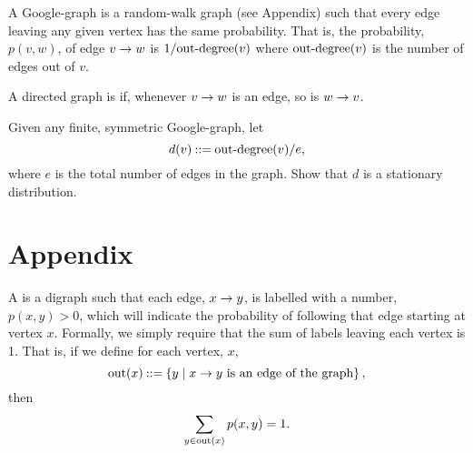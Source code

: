 \documentclass[11pt,twoside]{article}
\begin{document}
\begin{problem}

  A Google-graph is a random-walk graph (see Appendix) such that every
  edge leaving any given vertex has the same probability.  That is, the
  probability, $p(v,w)$, of edge $v \to w$ is $1/\text{out-degree}(v)$ where
  $\text{out-degree}(v)$ is the number of edges out of $v$.

  A directed graph is  if, whenever $v \to w$ is an
  edge, so is $w \to v$.

  Given any finite, symmetric Google-graph, let
\[
d(v) \mathbin{::=} \text{out-degree}(v)/e,
\]
where $e$ is the total number of edges in the graph.  Show that $d$ is a
stationary distribution.


\end{problem}



\section*{Appendix}

A  is a digraph such that each edge,
$x \to y$, is labelled with a number, $p(x,y) > 0$, which will
indicate the probability of following that edge starting at vertex $x$.
Formally, we simply require that the sum of labels leaving each vertex is
1.  That is, if we define for each vertex, $x$,
\[
\text{out}(x) \mathbin{::=} \left\{y \mid x \to y \text{ is an edge of the
    graph}\right\},
\]
then
\[
\sum_{y \in \text{out}(x)} p(x,y) = 1.
\]
\end{document}
